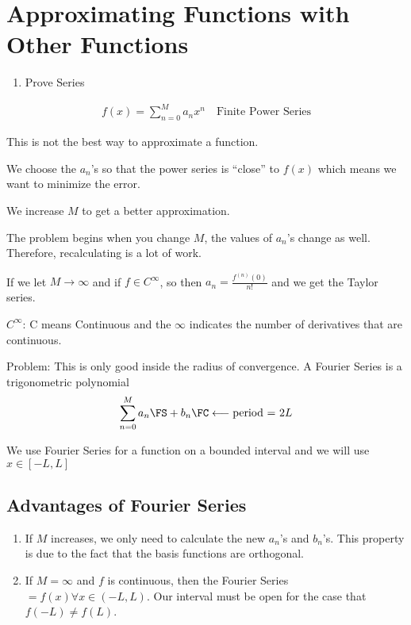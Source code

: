 \newpage
\section{Approximating Functions with Other Functions}

%
\begin{enumerate}
  \item Prove Series
\end{enumerate}

\begin{align}
  f(x) = \sum^M_{n = 0} a_n x^n \quad \text{Finite Power Series}
\end{align}

This is not the best way to approximate a function.

We choose the $a_n$'s so that the power series is ``close'' to $f(x)$ which
means we want to minimize the error.

We increase $M$ to get a better approximation.

The problem begins when you change $M$, the values of $a_n$'s change as well.
Therefore, recalculating is a lot of work.

If we let $M \to \infty$ and if $f \in C^\infty$, so then
$a_n = \frac{f^{(n)}(0)}{n!}$ and we get the Taylor series.

\note $C^\infty$: C means Continuous and the $\infty$ indicates the number of
derivatives that are continuous.

Problem: This is only good inside the radius of convergence.
%
\bigbreak
%
A Fourier Series is a trigonometric polynomial
%
\begin{align}
  \sum_{n = 0}^M a_n \FS + b_n \FC \longleftarrow \text{period = } 2L
\end{align}

We use Fourier Series for a function on a bounded interval and we will use $x\in [-L, L]$

\subsection{Advantages of Fourier Series}

\begin{enumerate}
  \item If $M$ increases, we only need to calculate the new $a_n$'s and
  $b_n$'s. This property is due to the fact that the basis functions are
  orthogonal.

  \item If $M = \infty$ and $f$ is continuous, then the Fourier Series $=
  f(x) \forall x \in (-L, L)$. Our interval must be open for the case that
  $f(-L) \neq f(L)$.
\end{enumerate}

